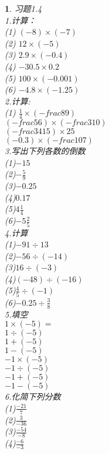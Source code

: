 \documentclass[11pt]{article}
\newtheorem{exercise}{ }
\begin{document}
\begin{exercise}
习题1.4\\
1.计算：\\
(1)
$(-8)\times(-7)$\\
(2)
$12\times(-5)$\\
(3)
$2.9\times(-0.4)$\\
(4)
$-30.5\times0.2$\\
(5)
$100\times(-0.001)$\\
(6)
$-4.8\times(-1.25)$\\

2.计算:\\
(1)
$\frac{1}{4}\times(-frac{8}{9})$\\
$(-frac{5}{6})\times(-frac{3}{10})$\\
$(-frac{34}{15})\times25$\\
$(-0.3)\times(-frac{10}{7})$\\

3.写出下列各数的倒数\\
(1)$-15$\\
(2)$-\frac{5}{9}$\\
(3)$-0.25$\\
(4)$0.17$\\
(5)$4\frac{1}{4}$\\
(6)$-5\frac{2}{5}$\\

4.计算\\
(1)$-91\div13$\\
(2)$-56\div(-14)$\\
(3)$16\div(-3)$\\
(4)$(-48)\div(-16)$\\
(5)$\frac{4}{5}\div(-1)$\\
(6)$-0.25\div\frac{3}{8}$\\

5.填空\\
$1\times(-5)=$\\
$1\div(-5)$\\
$1+(-5)$\\
$1-(-5)$\\
$-1\times(-5)$\\
$-1\div(-5)$\\
$-1+(-5)$\\
$-1-(-5)$\\

6.化简下列分数\\
(1)$\frac{-21}{7}$\\
(2)$\frac{3}{-36}$\\
(3)$\frac{-54}{-8}$\\
(4)$\frac{-6}{-3}$\\


\end{exercise}
\end{document}
